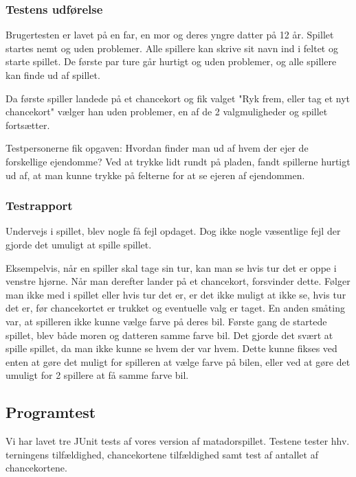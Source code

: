 \subsubsection{Testens udførelse}
Brugertesten er lavet på en far, en mor og deres yngre datter på 12 år. 
Spillet startes nemt og uden problemer. Alle spillere kan skrive sit navn ind i feltet og starte spillet. De første par ture går hurtigt og uden problemer, og alle spillere kan finde ud af spillet. 

Da første spiller landede på et chancekort og fik valget "Ryk frem, eller tag et nyt chancekort" vælger han uden problemer, en af de 2 valgmuligheder og spillet fortsætter.

Testpersonerne fik opgaven: Hvordan finder man ud af hvem der ejer de forskellige ejendomme?
Ved at trykke lidt rundt på pladen, fandt spillerne hurtigt ud af, at man kunne trykke på felterne for at se ejeren af ejendommen. 

\subsubsection{Testrapport}
Undervejs i spillet, blev nogle få fejl opdaget. Dog ikke nogle væsentlige fejl der gjorde det umuligt at spille spillet. 

Eksempelvis, når en spiller skal tage sin tur, kan man se hvis tur det er oppe i venstre hjørne. Når man derefter lander på et chancekort, forsvinder dette. Følger man ikke med i spillet eller hvis tur det er, er det ikke muligt at ikke se, hvis tur det er, før chancekortet er trukket og eventuelle valg er taget. 
En anden småting var, at spilleren ikke kunne vælge farve på deres bil. Første gang de startede spillet, blev både moren og datteren samme farve bil. Det gjorde det svært at spille spillet, da man ikke kunne se hvem der var hvem. Dette kunne fikses ved enten at gøre det muligt for spilleren at vælge farve på bilen, eller ved at gøre det umuligt for 2 spillere at få samme farve bil. 


\clearpage
\subsection{Programtest}
Vi har lavet tre JUnit tests af vores version af matadorspillet. Testene tester hhv. terningens tilfældighed, chancekortene tilfældighed samt test af antallet af chancekortene.

